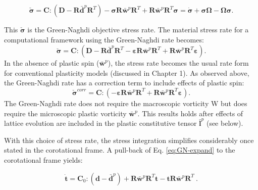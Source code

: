 \documentclass[11pt]{report}
\numberwithin{equation}{section}
\begin{document}
\begin{equation}
\check{\bm{\sigma}}=
\mathbf{C}:\left(\mathbf{D}-\mathbf{R}\bar{\mathbf{d}}^{p}\mathbf{R}^{T}\right)-
\bm{\sigma}\mathbf{R}\bar{\mathbf{w}}^{p}\mathbf{R}^{T}+
\mathbf{R}\bar{\mathbf{w}}^{p}\mathbf{R}^{T}\bm{\sigma}=\dot{\bm{\sigma}}+
\bm{\sigma}\bm{\Omega}-\bm{\Omega}\bm{\sigma}.\label{eq:GN-expand}
\end{equation}

This $\check{\bm{\sigma}}$ is the Green-Naghdi objective stress rate. 
The material stress rate for a computational framework
using the Green-Naghdi rate becomes:
\[
\check{\bm{\sigma}}=
\mathbf{C}:\left(\mathbf{D}-\mathbf{R}\bar{\mathbf{d}}^{p}\mathbf{R}^{T}-
\bm{\varepsilon}\mathbf{R}\bar{\mathbf{w}}^{p}\mathbf{R}^{T}+
\mathbf{R}\bar{\mathbf{w}}^{p}\mathbf{R}^{T}\bm{\varepsilon}\right).
\]
In the absence of plastic spin ($\bar{\mathbf{w}}^{p}$), the stress rate
becomes the usual rate form for conventional
plasticity models (discussed in Chapter 1). As observed above, the Green-Naghdi
rate has a correction term to include effects of plastic spin:
\[
\check{\bm{\sigma}}^{corr}=\mathbf{C}:\left(-\bm{\varepsilon}\mathbf{R}
\bar{\mathbf{w}}^{p}\mathbf{R}^{T}+
\mathbf{R}\bar{\mathbf{w}}^{p}\mathbf{R}^{T}\bm{\varepsilon}\right).
\]
The Green-Naghdi rate does not require the macroscopic vorticity
W but does require the microscopic plastic vorticity $\bar{\mathbf{w}}^{p}$.
This results holds after
effects of lattice evolution are included in the plastic constitutive
tensor $\bar{\mathbf{l}}^{p}$ (see below).

With this choice of stress
rate, the stress integration simplifies considerably once stated in
the corotational frame. A pull-back of Eq. \ref{eq:GN-expand} to
the corotational frame yields:

\begin{equation}
\dot{\mathbf{t}}=\mathbf{C}_{0}:\left(\mathbf{d}-
\bar{\mathbf{d}}^{p}\right)+\mathbf{R}\bar{\mathbf{w}}^{p}\mathbf{R}^{T}\mathbf{t}-
\mathbf{t}\mathbf{R}\bar{\mathbf{w}}^{p}\mathbf{R}^{T}\ . \label{eq:gn-warp3d}
\end{equation}
\end{document}
